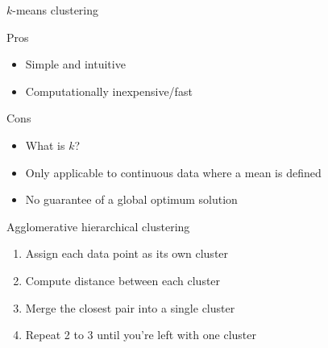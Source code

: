 \documentclass[pdf]{beamer}
\begin{document}
\begin{frame}{$k$-means clustering}
\begin{exampleblock}{Pros}
\begin{itemize}
	\item Simple and intuitive
	\item Computationally inexpensive/fast 
\end{itemize}
\end{exampleblock}
\vfill
\begin{alertblock}{Cons}
\begin{itemize}
	\item What is $k$?
	\item Only applicable to continuous data where a mean is defined
	\item No guarantee of a global optimum solution
\end{itemize}
\end{alertblock}
\end{frame}
\begin{frame}{Agglomerative hierarchical clustering}
\begin{enumerate}\addtolength{\itemsep}{0.5\baselineskip}
	\item<1-> Assign each data point as its own cluster
	\item<2-> Compute distance between each cluster
	\item<3-> Merge the closest pair into a single cluster
	\item<4-> Repeat 2 to 3 until you're left with one cluster
\end{enumerate}
\vfill
{}
\end{frame}
\end{document}
